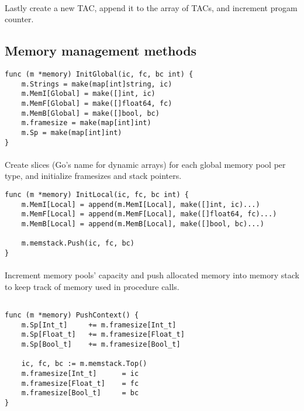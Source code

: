 \paragraph{} Lastly create a new TAC, append it to the array of TACs, and
increment progam counter.

\newpage

\subsection{Memory management methods}

\begin{verbatim}
func (m *memory) InitGlobal(ic, fc, bc int) {
    m.Strings = make(map[int]string, ic)
    m.MemI[Global] = make([]int, ic)
    m.MemF[Global] = make([]float64, fc)
    m.MemB[Global] = make([]bool, bc)
    m.framesize = make(map[int]int)
    m.Sp = make(map[int]int)
}
\end{verbatim}

\paragraph{} Create slices (Go's name for dynamic arrays) for each global
memory pool per type, and initialize framesizes and stack pointers.

\begin{verbatim}
func (m *memory) InitLocal(ic, fc, bc int) {
    m.MemI[Local] = append(m.MemI[Local], make([]int, ic)...)
    m.MemF[Local] = append(m.MemF[Local], make([]float64, fc)...)
    m.MemB[Local] = append(m.MemB[Local], make([]bool, bc)...)

    m.memstack.Push(ic, fc, bc)
}

\end{verbatim}

\paragraph{} Increment memory pools' capacity and push allocated memory into
memory stack to keep track of memory used in procedure calls.

\begin{verbatim}

func (m *memory) PushContext() {
    m.Sp[Int_t]     += m.framesize[Int_t]
    m.Sp[Float_t]   += m.framesize[Float_t]
    m.Sp[Bool_t]    += m.framesize[Bool_t]

    ic, fc, bc := m.memstack.Top()
    m.framesize[Int_t]      = ic
    m.framesize[Float_t]    = fc
    m.framesize[Bool_t]     = bc
}
\end{verbatim}

